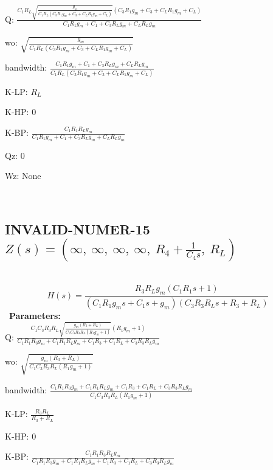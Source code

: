 \documentclass{article}
\begin{document}
Q: $\frac{C_{1} R_{L} \sqrt{\frac{g_{m}}{C_{1} R_{L} \left(C_{3} R_{1} g_{m} + C_{3} + C_{L} R_{1} g_{m} + C_{L}\right)}} \left(C_{3} R_{1} g_{m} + C_{3} + C_{L} R_{1} g_{m} + C_{L}\right)}{C_{1} R_{1} g_{m} + C_{1} + C_{3} R_{L} g_{m} + C_{L} R_{L} g_{m}}$\ 

wo: $\sqrt{\frac{g_{m}}{C_{1} R_{L} \left(C_{3} R_{1} g_{m} + C_{3} + C_{L} R_{1} g_{m} + C_{L}\right)}}$\ 

bandwidth: $\frac{C_{1} R_{1} g_{m} + C_{1} + C_{3} R_{L} g_{m} + C_{L} R_{L} g_{m}}{C_{1} R_{L} \left(C_{3} R_{1} g_{m} + C_{3} + C_{L} R_{1} g_{m} + C_{L}\right)}$\ 

K-LP: $R_{L}$\ 

K-HP: $0$\ 

K-BP: $\frac{C_{1} R_{1} R_{L} g_{m}}{C_{1} R_{1} g_{m} + C_{1} + C_{3} R_{L} g_{m} + C_{L} R_{L} g_{m}}$\ 

Qz: $0$\ 

Wz: $\text{None}$\ 

\ 

\subsection{INVALID-NUMER-15 $Z(s) = \left( \infty, \  \infty, \  \infty, \  \infty, \  R_{4} + \frac{1}{C_{4} s}, \  R_{L}\right)$ } \ 
\textbf{\[H(s) = \frac{R_{3} R_{L} g_{m} \left(C_{1} R_{1} s + 1\right)}{\left(C_{1} R_{1} g_{m} s + C_{1} s + g_{m}\right) \left(C_{3} R_{3} R_{L} s + R_{3} + R_{L}\right)}\] } \ 
\textbf{Parameters:}\\ 

Q: $\frac{C_{1} C_{3} R_{3} R_{L} \sqrt{\frac{g_{m} \left(R_{3} + R_{L}\right)}{C_{1} C_{3} R_{3} R_{L} \left(R_{1} g_{m} + 1\right)}} \left(R_{1} g_{m} + 1\right)}{C_{1} R_{1} R_{3} g_{m} + C_{1} R_{1} R_{L} g_{m} + C_{1} R_{3} + C_{1} R_{L} + C_{3} R_{3} R_{L} g_{m}}$\ 

wo: $\sqrt{\frac{g_{m} \left(R_{3} + R_{L}\right)}{C_{1} C_{3} R_{3} R_{L} \left(R_{1} g_{m} + 1\right)}}$\ 

bandwidth: $\frac{C_{1} R_{1} R_{3} g_{m} + C_{1} R_{1} R_{L} g_{m} + C_{1} R_{3} + C_{1} R_{L} + C_{3} R_{3} R_{L} g_{m}}{C_{1} C_{3} R_{3} R_{L} \left(R_{1} g_{m} + 1\right)}$\ 

K-LP: $\frac{R_{3} R_{L}}{R_{3} + R_{L}}$\ 

K-HP: $0$\ 

K-BP: $\frac{C_{1} R_{1} R_{3} R_{L} g_{m}}{C_{1} R_{1} R_{3} g_{m} + C_{1} R_{1} R_{L} g_{m} + C_{1} R_{3} + C_{1} R_{L} + C_{3} R_{3} R_{L} g_{m}}$\ 
\end{document}

